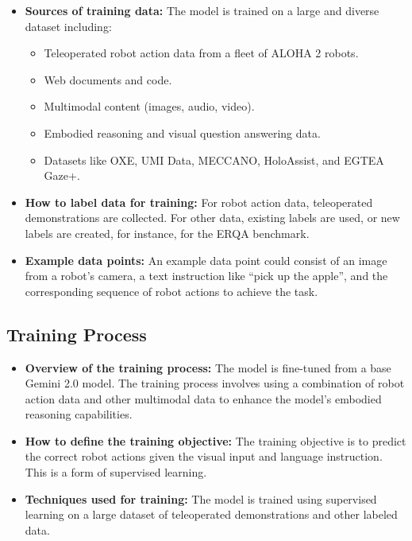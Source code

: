 \documentclass[12pt,a4paper]{article}
\begin{document}
\begin{itemize}
    \item \textbf{Sources of training data:} The model is trained on a large and diverse dataset including:
    \begin{itemize}
        \item Teleoperated robot action data from a fleet of ALOHA 2 robots.
        \item Web documents and code.
        \item Multimodal content (images, audio, video).
        \item Embodied reasoning and visual question answering data.
        \item Datasets like OXE, UMI Data, MECCANO, HoloAssist, and EGTEA Gaze+.
    \end{itemize}

    \item \textbf{How to label data for training:} For robot action data, teleoperated demonstrations are collected. For other data, existing labels are used, or new labels are created, for instance, for the ERQA benchmark.

    \item \textbf{Example data points:} An example data point could consist of an image from a robot's camera, a text instruction like ``pick up the apple'', and the corresponding sequence of robot actions to achieve the task.
\end{itemize}

\subsection{Training Process}

\begin{itemize}
    \item \textbf{Overview of the training process:} The model is fine-tuned from a base Gemini 2.0 model. The training process involves using a combination of robot action data and other multimodal data to enhance the model's embodied reasoning capabilities.

    \item \textbf{How to define the training objective:} The training objective is to predict the correct robot actions given the visual input and language instruction. This is a form of supervised learning.

    \item \textbf{Techniques used for training:} The model is trained using supervised learning on a large dataset of teleoperated demonstrations and other labeled data.
\end{itemize}
\end{document}
